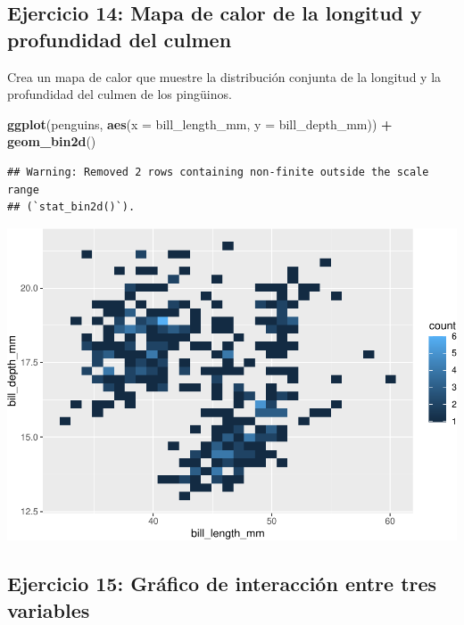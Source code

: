 \documentclass[
]{book}
\newenvironment{Shaded}{\begin{snugshade}}{\end{snugshade}}
\newcommand{\AttributeTok}[1]{\textcolor[rgb]{0.13,0.29,0.53}{#1}}
\newcommand{\FunctionTok}[1]{\textcolor[rgb]{0.13,0.29,0.53}{\textbf{#1}}}
\newcommand{\NormalTok}[1]{#1}
\newcommand{\SpecialCharTok}[1]{\textcolor[rgb]{0.81,0.36,0.00}{\textbf{#1}}}
\begin{document}
\hypertarget{ejercicio-14-mapa-de-calor-de-la-longitud-y-profundidad-del-culmen}{%
\subsection{Ejercicio 14: Mapa de calor de la longitud y profundidad del culmen}\label{ejercicio-14-mapa-de-calor-de-la-longitud-y-profundidad-del-culmen}}

Crea un mapa de calor que muestre la distribución conjunta de la longitud y la profundidad del culmen de los pingüinos.

\begin{Shaded}
\begin{Highlighting}[]
\FunctionTok{ggplot}\NormalTok{(penguins, }\FunctionTok{aes}\NormalTok{(}\AttributeTok{x =}\NormalTok{ bill\_length\_mm, }\AttributeTok{y =}\NormalTok{ bill\_depth\_mm)) }\SpecialCharTok{+}
  \FunctionTok{geom\_bin2d}\NormalTok{()}
\end{Highlighting}
\end{Shaded}

\begin{verbatim}
## Warning: Removed 2 rows containing non-finite outside the scale range
## (`stat_bin2d()`).
\end{verbatim}

\includegraphics{bookdown-demo_files/figure-latex/unnamed-chunk-190-1.pdf}

\hypertarget{ejercicio-15-gruxe1fico-de-interacciuxf3n-entre-tres-variables}{%
\subsection{Ejercicio 15: Gráfico de interacción entre tres variables}\label{ejercicio-15-gruxe1fico-de-interacciuxf3n-entre-tres-variables}}
\end{document}
